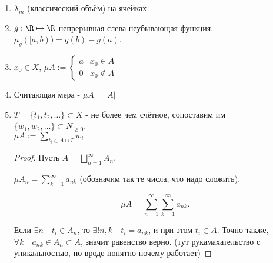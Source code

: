 \begin{example}[меры] \thmslashn

    \begin{enumerate}
        \item $\lambda_{m}$ (классический объём) на ячейках
        \item $g : \R \mapsto \R$ непрерывная слева неубывающая функция. $\mu_{g}([a, b)) = g(b) - g(a)$.
        \item $x_0\in X$, $\mu A := \begin{cases}
                a & x_0\in A\\
                0 & x_0 \not\in A
        \end{cases}$
    \item Считающая мера - $\mu A = |A|$
    \item $T = \{t_1, t_2, \ldots\} \subset X $ - не более чем счётное, сопоставим им $\{w_1, w_2, \ldots\} \subset N_{\ge 0}$.\\
        $\mu A := \sum\limits_{t_{i}\in A\cap T} w_{i}$
        \begin{proof} \thmslashn
        
            Пусть $A = \bigsqcup\limits_{n=1}^{\infty} A_{n}$.

            $\mu A_{n} = \sum\limits_{k=1}^{\infty} a_{nk}$ (обозначим так те числа, что надо сложить).

            \[ \mu A = \sum\limits_{n=1}^{\infty} \sum\limits_{k=1}^{\infty} a_{nk} .\]

            Если $\exists{n}\quad t_{i}\in A_{n}$, то $\exists!{n, k}\quad t_{i} = a_{nk}$, и при этом $t_{i}\in A$. Точно также, $\forall{k}\quad a_{nk}\in A_{n} \subset A$, значит равенство верно. (тут рукамахательство с уникальностью, но вроде понятно почему работает)
        \end{proof}
    \end{enumerate}
\end{example}
